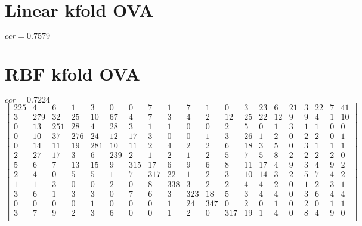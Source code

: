 \documentclass[a4paper, 11pt]{article}
\begin{document}
\section{Linear kfold OVA}
\label{code:Linear_kfold_OVA}
$ccr=0.7579$

\section{RBF kfold OVA}
$ccr=0.7224$
\[\begin{bmatrix}
   225  &   4  &   6  &   1   &  3  &   0 &    0  &   7  &   1  &   7  &   1 &    0  &   3  &  23  &   6  &  21  &   3  &  22  &   7  &  41 \\
     3  & 279  &  32  &  25   & 10  &  67 &    4  &   7  &   3  &   4  &   2 &   12  &  25  &  22  &  12  &   9  &   9  &   4  &   1  &  10 \\
     0  &  13  & 251  &  28   &  4  &  28 &    3  &   1  &   1  &   0  &   0 &    2  &   5  &   0  &   1  &   3  &   1  &   1  &   0  &   0 \\
     0  &  10  &  37  & 276   & 24  &  12 &   17  &   3  &   0  &   0  &   1 &    3  &  26  &   1  &   2  &   0  &   2  &   2  &   0  &   1 \\
     0  &  14  &  11  &  19   &281  &  10 &   11  &   2  &   4  &   2  &   2 &    6  &  18  &   3  &   5  &   0  &   3  &   1  &   1  &   1 \\
     2  &  27  &  17  &   3   &  6  & 239 &    2  &   1  &   2  &   1  &   2 &    5  &   7  &   5  &   8  &   2  &   2  &   2  &   2  &   0 \\
     5  &   6  &   7  &  13   & 15  &   9 &  315  &  17  &   6  &   9  &   6 &    8  &  11  &  17  &   4  &   9  &   3  &   4  &   9  &   2 \\
     2  &   4  &   0  &   5   &  5  &   1 &    7  & 317  &  22  &   1  &   2 &    3  &  10  &  14  &   3  &   2  &   5  &   7  &   4  &   2 \\
     1  &   1  &   3  &   0   &  0  &   2 &    0  &   8  & 338  &   3  &   2 &    2  &   4  &   4  &   2  &   0  &   1  &   2  &   3  &   1 \\
     3  &   6  &   1  &   3   &  3  &   0 &    7  &   6  &   3  & 323  &  18 &    5  &   3  &   4  &   4  &   0  &   3  &   6  &   4  &   4 \\
     0  &   0  &   0  &   0   &  1  &   0 &    0  &   0  &   1  &  24  & 347 &    0  &   2  &   0  &   1  &   0  &   2  &   0  &   1  &   1 \\
     3  &   7  &   9  &   2   &  3  &   6 &    0  &   0  &   1  &   2  &   0 &  317  &  19  &   1  &   4  &   0  &   8  &   4  &   9  &   0 \\

\end{bmatrix}\]
\end{document}
